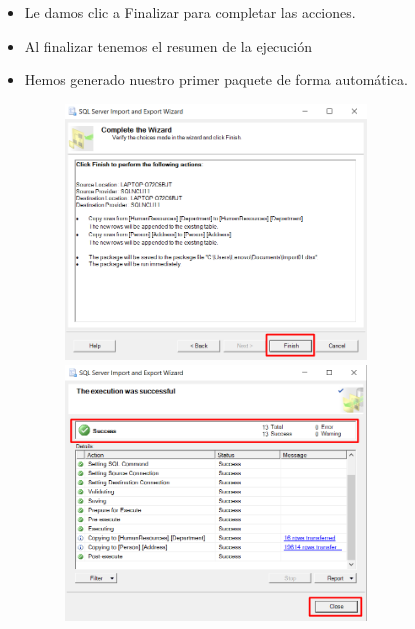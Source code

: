 \documentclass[12pt,letterpaper]{article}
\begin{document}
\begin{itemize}
\item Le damos clic a Finalizar para completar las acciones.
\item Al finalizar tenemos el resumen de la ejecución
\item Hemos generado nuestro primer paquete de forma automática.
	\begin{figure}[htb]
		\begin{center}
			\includegraphics[width=8cm]{./IMAGENES/Tarea1_9}
			\includegraphics[width=8cm]{./IMAGENES/Tarea1_10}
		\end{center}
	\end{figure}

\newpage


\end{itemize}
\end{document}
